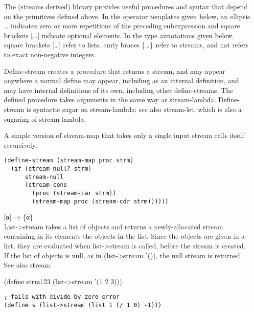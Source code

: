 
The (streams derived) library provides useful procedures and syntax that
depend on the primitives defined above. In the operator templates given
below, an ellipsis \ldots{} indicates zero or more repetitions of the
preceding subexpression and square brackets {[}\ldots{}{]} indicate
optional elements. In the type annotations given below, square brackets
{[}\ldots{}{]} refer to lists, curly braces \{\ldots{}\} refer to
streams, and nat refers to exact non-negative integers.

\begin{entry}{%
  }

  Define-stream creates a procedure that returns a stream, and may
  appear anywhere a normal define may appear, including as an internal
  definition, and may have internal definitions of its own, including
  other define-streams. The defined procedure takes arguments in the
  same way as stream-lambda. Define-stream is syntactic sugar on
  stream-lambda; see also stream-let, which is also a sugaring of
  stream-lambda.

  A simple version of stream-map that takes only a single input stream
  calls itself recursively:

\begin{verbatim}
(define-stream (stream-map proc strm)
  (if (stream-null? strm)
      stream-null
      (stream-cons
        (proc (stream-car strm))
        (stream-map proc (stream-cdr strm))))))
\end{verbatim}
\end{entry}

\begin{entry}{%
  }

  {[}α{]} → \{α\}\\
  List->stream takes a list of objects and returns a newly-allocated
  stream containing in its elements the objects in the list. Since the
  objects are given in a list, they are evaluated when list->stream is
  called, before the stream is created. If the list of objects is
  null, as in (list->stream '()), the null stream is returned. See
  also stream.

  (define strm123 (list->stream '(1 2 3)))

\begin{verbatim}
; fails with divide-by-zero error
(define s (list->stream (list 1 (/ 1 0) -1)))
\end{verbatim}
\end{entry}

